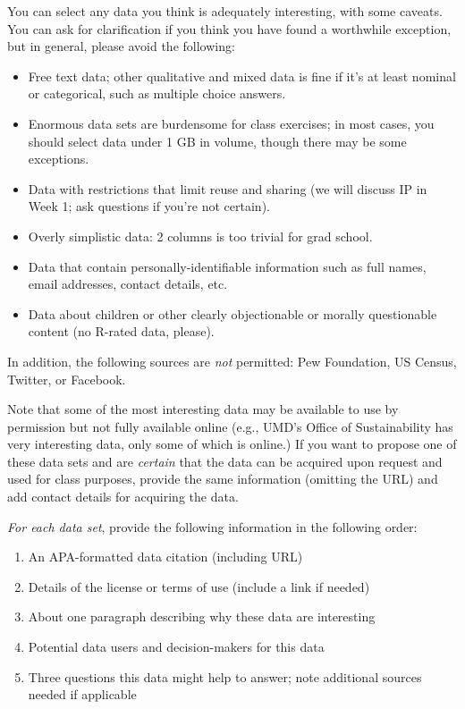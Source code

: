 \documentclass[11pt]{article}
\begin{document}
You can select any data you think is adequately interesting, with some caveats.
You can ask for clarification if you think you have found a worthwhile exception, but in general, please avoid the following:
\begin{itemize}
\item Free text data; other qualitative and mixed data is fine if it's at least nominal or categorical, such as multiple choice answers.
\item Enormous data sets are burdensome for class exercises; in most cases, you should select data under 1 GB in volume, though there may be some exceptions.
\item Data with restrictions that limit reuse and sharing (we will discuss IP in Week 1; ask questions if you're not certain).
\item Overly simplistic data: 2 columns is too trivial for grad school.
\item Data that contain personally-identifiable information such as full names, email addresses, contact details, etc.
\item Data about children or other clearly objectionable or morally questionable content (no R-rated data, please).
\end{itemize}
In addition, the following sources are \textit{not} permitted: Pew Foundation, US Census, Twitter, or Facebook.

Note that some of the most interesting data may be available to use by permission but not fully available online (e.g., UMD's Office of Sustainability has very interesting data, only some of which is online.)
If you want to propose one of these data sets and are \textit{certain} that the data can be acquired upon request and used for class purposes, provide the same information (omitting the URL) and add contact details for acquiring the data.

\textit{For each data set}, provide the following information in the following order:
\begin{enumerate}
\item An APA-formatted data citation (including URL)
\item Details of the license or terms of use (include a link if needed)
\item About one paragraph describing why these data are interesting
\item Potential data users and decision-makers for this data
\item Three questions this data might help to answer; note additional sources needed if applicable
\end{enumerate}
\end{document}
